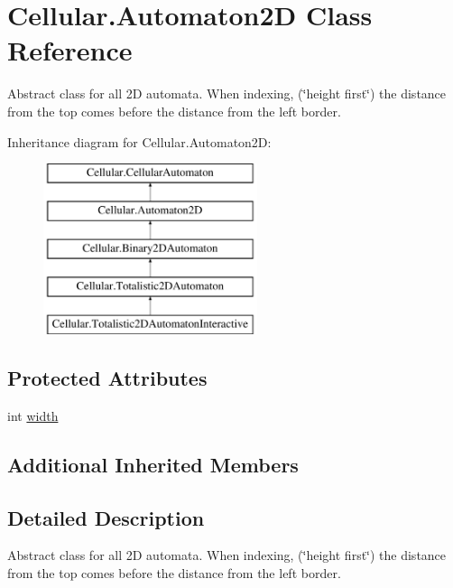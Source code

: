\hypertarget{class_cellular_1_1_automaton2_d}{}\section{Cellular.\+Automaton2\+D Class Reference}
\label{class_cellular_1_1_automaton2_d}


Abstract class for all 2\+D automata. When indexing, (\char`\"{}height first\char`\"{}) the distance from the top comes before the distance from the left border.  


Inheritance diagram for Cellular.\+Automaton2\+D\+:\begin{figure}[H]
\begin{center}
\leavevmode
\includegraphics[height=5.000000cm]{class_cellular_1_1_automaton2_d}
\end{center}
\end{figure}
\subsection*{Protected Attributes}
\begin{DoxyCompactItemize}
\item 
int \hyperlink{class_cellular_1_1_automaton2_d_a1e9e5ec637c747a859c346839c90d174}{width}
\end{DoxyCompactItemize}
\subsection*{Additional Inherited Members}


\subsection{Detailed Description}
Abstract class for all 2\+D automata. When indexing, (\char`\"{}height first\char`\"{}) the distance from the top comes before the distance from the left border. 



